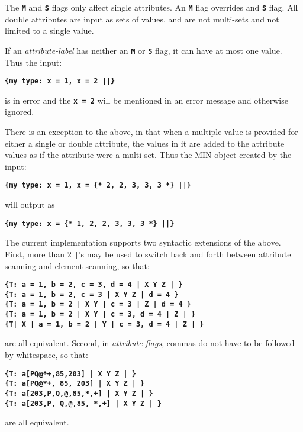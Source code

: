 \documentclass[12pt]{article}
\newcommand{\TT}[1]{{\tt \bfseries #1}}
\begin{document}
The \TT{M} and \TT{S} flags only affect single attributes.  An \TT{M}
flag overrides and \TT{S} flag.  All double
attributes are input as sets of values, and are not multi-sets and
not limited to a single value.

If an {\em attribute-label} has neither an \TT{M} or \TT{S} flag,
it can have at most one value.  Thus the input:
\begin{center}
\TT{\{my type: x = 1, x = 2 ||\}}
\end{center}
is in error and the \TT{x = 2} will be mentioned in an error message
and otherwise ignored.

There is an exception to the above, in that when a multiple value
is provided for either a single or double attribute, the values
in it are added to the attribute values as if the attribute were
a multi-set.  Thus the MIN object created by the input:
\begin{center}
\TT{\{my type: x = 1, x = \{* 2, 2, 3, 3, 3 *\} ||\}}
\end{center}
will output as
\begin{center}
\TT{\{my type: x = \{* 1, 2, 2, 3, 3, 3 *\} ||\}}
\end{center}

The current implementation supports two syntactic extensions of
the above.  First, more than 2 \TT{|}'s may be used to switch
back and forth between attribute scanning and element scanning,
so that:
\begin{center}
\TT{\{T: a = 1, b = 2, c = 3, d = 4 | X Y Z | \}} \\
\TT{\{T: a = 1, b = 2, c = 3 | X Y Z | d = 4 \}} \\
\TT{\{T: a = 1, b = 2 | X Y | c = 3 | Z | d = 4 \}} \\
\TT{\{T: a = 1, b = 2 | X Y | c = 3, d = 4 | Z | \}} \\
\TT{\{T| X | a = 1, b = 2 | Y | c = 3, d = 4 | Z | \}} \\
\end{center}
are all equivalent.  Second, in {\em attribute-flags}, commas
do not have to be followed by whitespace, so that:
\begin{center}
\TT{\{T: a[PQ@*+,85,203] | X Y Z | \}} \\
\TT{\{T: a[PQ@*+, 85, 203] | X Y Z | \}} \\
\TT{\{T: a[203,P,Q,@,85,*,+] | X Y Z | \}} \\
\TT{\{T: a[203,P, Q,@,85, *,+] | X Y Z | \}} \\
\end{center}
are all equivalent.
\end{document}

